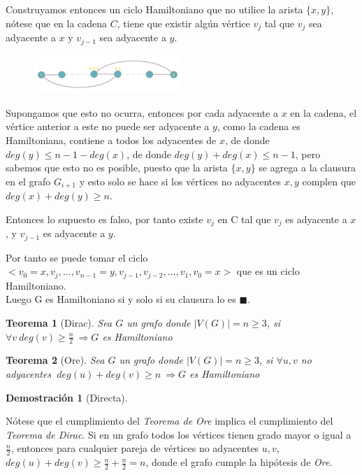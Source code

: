 \documentclass[a4paper,1pt]{report}
\newtheorem*{teo}{Teorema}
\newtheorem*{dem}{Demostración}
\begin{document}
Construyamos entonces un ciclo Hamiltoniano que no utilice la arista $\{x,y\}$, n\'otese que en la cadena $C$, tiene que existir alg\'un v\'ertice $v_j$ tal que $v_j$ sea adyacente a $x$ y $v_{j-1}$ sea adyacente a $y$.

\begin{figure}[H]
    \centering
    \includegraphics[width=0.5\textwidth]{figures4/clausura_demo.png}
\end{figure} 

Supongamos que esto no ocurra, entonces por cada adyacente a $x$ en la cadena, el v\'ertice anterior a este no puede ser adyacente a $y$, como la cadena es Hamiltoniana, contiene a todos los adyacentes de $x$, de donde $deg(y) \leq n - 1 - deg(x)$, de donde $deg(y) + deg(x) \leq n -1$, pero sabemos que esto no es posible, puesto que la arista $\{x,y\}$ se agrega a la clausura en el grafo $G_{i+1}$ y esto solo se hace si los v\'ertices no adyacentes $x,y$ complen que $deg(x) + deg(y) \geq n$.

Entonces lo supuesto es falso, por tanto existe $v_{j}$ en C tal que $v_j$ es adyacente a $x$, y $v_{j-1}$ es adyacente a $y$. 

Por tanto se puede tomar el ciclo $<v_0=x,v_{j},\dots,v_{n-1}=y,v_{j -1},v_{j-2},\dots,v_1,v_0=x>$ que es un ciclo Hamiltoniano.\\

Luego G es Hamiltoniano si y solo si su clausura lo es $\blacksquare$.

\begin{teo}[Dirac]
    Sea $G$ un grafo donde $|V(G)|= n\geq 3$, si $\forall v~ deg(v) \geq \frac{n}{2} ~ \Rightarrow G$ es Hamiltoniano 
\end{teo}

\begin{teo}[Ore]
    Sea $G$ un grafo donde $|V(G)|= n\geq 3$, si $\forall u,v$ no adyacentes $~ deg(u) + deg(v) \geq n ~ \Rightarrow G$ es Hamiltoniano 
\end{teo}

\begin{dem}[Directa]\end{dem}

N\'otese que el cumplimiento del \textit{Teorema de Ore} implica el cumplimiento del \textit{Teorema de Dirac}. 
Si en un grafo todos los v\'ertices tienen grado mayor o igual a $\frac{n}{2}$, entonces para cualquier pareja de v\'ertices no adyacentes $u, v$, $deg(u) + deg(v) \geq \frac{n}{2} + \frac{n}{2} = n$, donde el grafo cumple la hip\'otesis de \textit{Ore}.
\end{document}
